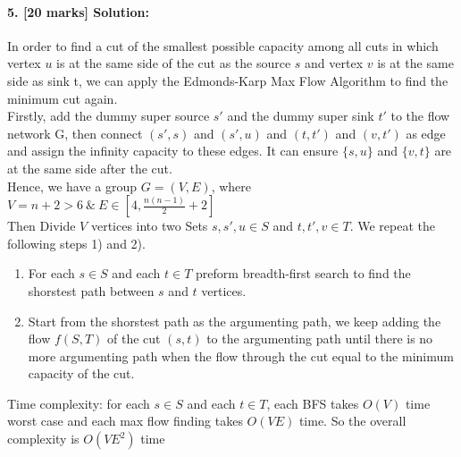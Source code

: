 \documentclass[a4paper]{scrartcl}
\begin{document}
\paragraph{5. [20 marks] Solution:}
\label{sec:Question 5}
In order to find a cut of the smallest possible capacity among all cuts in which vertex $u$ is at the same side of the cut as the source $s$ and vertex $v$ is at the same side as sink t, we can apply the Edmonds-Karp Max Flow Algorithm to find the minimum cut again.\\
Firstly, add the dummy super source $s'$ and the dummy super sink $t'$ to the flow network G, then connect $(s', s)$ and $(s', u)$ and $(t,t')$ and $(v, t')$ as edge and assign the infinity capacity to these edges. It can ensure $\{s,u\}$ and $\{v, t\}$ are at the same side after the cut.\\
Hence, we have a group $G=(V,E)$, where $V=n + 2 > 6\ \&\ E\in [4, \frac{n(n-1)}{2}+2]$\\
Then Divide $V$ vertices into two Sets $s, s',u \in S$ and $t, t',v \in T$. We repeat the following steps 1) and 2).
\begin{enumerate}[label=\arabic{*})]
  \item For each $s \in S$ and each $t \in T$ preform breadth-first search to find the shorstest path between $s$ and $t$ vertices.
  \item Start from the shorstest path as the argumenting path, we keep adding the flow $f(S,T)$ of the cut $(s,t)$ to the argumenting path until there is no more argumenting path when the flow through the cut equal to the minimum capacity of the cut.    
\end{enumerate}
Time complexity: for each $s \in S$ and each $t \in T$, each BFS takes $O(V)$ time worst case and each max flow finding takes $O(VE)$ time. So the overall complexity is $O(VE^2)$ time
\end{document}
